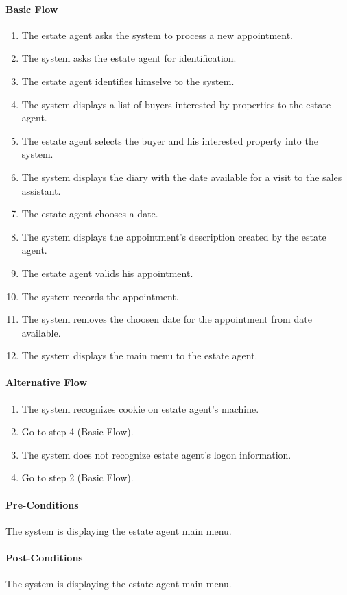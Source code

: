 \documentclass[a4paper,12pt]{article}
\begin{document}
\paragraph{Basic Flow}
\begin{enumerate}
\item The estate agent asks the system to process a new appointment.
\item The system asks the estate agent for identification.
\item The estate agent identifies himselve to the system.
\item The system displays a list of buyers interested by properties to the estate agent.
\item The estate agent selects the buyer and his interested property into the system.
\item The system displays the diary with the date available for a visit to the sales assistant.
\item The estate agent chooses a date.
\item The system displays the appointment's description created by the estate agent.
\item The estate agent valids his appointment.
\item The system records the appointment.
\item The system removes the choosen date for the appointment from date available.
\item The system displays the main menu to the estate agent.
\end{enumerate}
\paragraph{Alternative Flow}
\begin{enumerate}
\item The system recognizes cookie on estate agent's machine. 
\item Go to step 4 (Basic Flow).
\item The system does not recognize estate agent's logon information.
\item Go to step 2 (Basic Flow).
\end{enumerate}
\paragraph{Pre-Conditions}
The system is displaying the estate agent main menu.
\paragraph{Post-Conditions}
The system is displaying the estate agent main menu.
\end{document}
